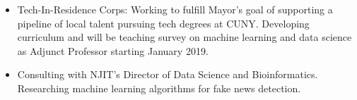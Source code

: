 \documentclass[a4paper,10pt]{memoir} %
\begin{document}
\begin{itemize}
	\item Tech-In-Residence Corps: Working to fulfill Mayor's goal of supporting a pipeline of local talent pursuing tech degrees at CUNY. Developing curriculum and will be teaching survey on machine learning and data science as Adjunct Professor starting January 2019.

	\item Consulting with NJIT's Director of Data Science and Bioinformatics. Researching machine learning algorithms for fake news detection.
\end{itemize}

\Sep %

\end{document}
